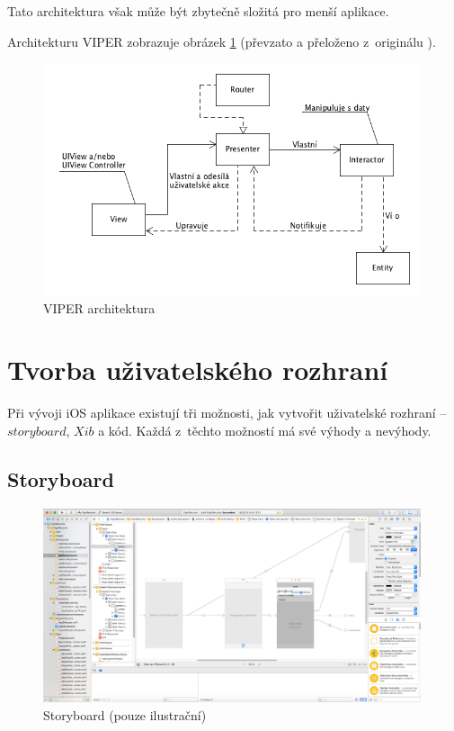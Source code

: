 \documentclass[thesis=M,czech]{FITthesis}[2012/06/26]
\begin{document}
Tato architektura však může být zbytečně složitá pro menší aplikace. \cite{Orlov}

Architekturu VIPER zobrazuje obrázek \ref{fig:viper} (převzato a přeloženo z~originálu \cite{viper-pic}).

\begin{figure}[h]\centering
 \includegraphics[width=0.99\textwidth]{./pictures/architektury/viper.png}
 \caption[VIPER architektura]{VIPER architektura}\label{fig:viper}
\end{figure}

\section{Tvorba uživatelského rozhraní}
Při vývoji iOS aplikace existují tři možnosti, jak vytvořit uživatelské rozhraní -- $storyboard$, $Xib$ a kód. Každá z~těchto možností má své výhody a nevýhody. \cite{iOSUI}

\subsection{Storyboard}

\begin{figure}[]\centering
 \includegraphics[width=0.99\textwidth]{./pictures/storyboard}
 \caption[Storyboard]{Storyboard (pouze ilustrační)}\label{fig:SB}
\end{figure}
\end{document}
